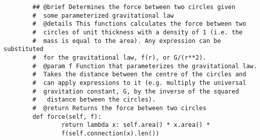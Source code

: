 \documentclass{article}
\begin{document}
\begin{lstlisting}
        ## @brief Determines the force between two circles given 
        #  some parameterized gravitational law
        #  @details This functions calculates the force between two 
        #  circles of unit thickness with a density of 1 (i.e. the 
        #  mass is equal to the area). Any expression can be substituted 
        #  for the gravitational law, f(r), or G/(r**2).
        #  @param f Function that parameterizes the gravitational law. 
        #  Takes the distance between the centre of the circles and 
        #  can apply expressions to it (e.g. multiply the universal 
        #  gravitation constant, G, by the inverse of the squared 
        #   distance between the circles).
        #  @return Returns the force between two circles 
        def force(self, f):
                return lambda x: self.area() * x.area() * 
                f(self.connection(x).len())

\end{lstlisting}
\end{document}
